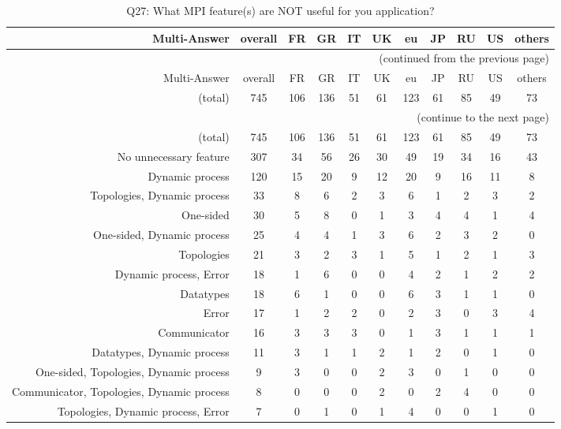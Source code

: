 \clearpage%
{\footnotesize\begin{landscape}%
\begin{longtable}[htb]{r|c|c|c|c|c|c|c|c|c|c}%
\caption{Q27: What MPI feature(s) are NOT useful for you application?}%
\label{tab:Q27-mans} \\%
\hline%
Multi-Answer & overall & FR & GR & IT & UK & eu & JP & RU & US & others \\
 \hline%
\endfirsthead%
\multicolumn{11}{r}{(continued from the previous page)}\\%
\hline%
Multi-Answer & overall & FR & GR & IT & UK & eu & JP & RU & US & others \\
 \hline%
\endhead%
\hline%
(total) & 745 & 106 & 136 & 51 & 61 & 123 & 61 & 85 & 49 & 73 \\%
\hline%
\multicolumn{11}{r}{(continue to the next page)}\\%
\endfoot%
\hline%
(total) & 745 & 106 & 136 & 51 & 61 & 123 & 61 & 85 & 49 & 73 \\%
\hline%
\endlastfoot%
\hline%
{No unnecessary feature} & 307 & 34 & 56 & 26 & 30 & 49 & 19 & 34 & 16 & 43 \\%
{Dynamic process} & 120 & 15 & 20 & 9 & 12 & 20 & 9 & 16 & 11 & 8 \\%
{Topologies, Dynamic process} & 33 & 8 & 6 & 2 & 3 & 6 & 1 & 2 & 3 & 2 \\%
{One-sided} & 30 & 5 & 8 & 0 & 1 & 3 & 4 & 4 & 1 & 4 \\%
{One-sided, Dynamic process} & 25 & 4 & 4 & 1 & 3 & 6 & 2 & 3 & 2 & 0 \\%
{Topologies} & 21 & 3 & 2 & 3 & 1 & 5 & 1 & 2 & 1 & 3 \\%
{Dynamic process, Error} & 18 & 1 & 6 & 0 & 0 & 4 & 2 & 1 & 2 & 2 \\%
{Datatypes} & 18 & 6 & 1 & 0 & 0 & 6 & 3 & 1 & 1 & 0 \\%
{Error} & 17 & 1 & 2 & 2 & 0 & 2 & 3 & 0 & 3 & 4 \\%
{Communicator} & 16 & 3 & 3 & 3 & 0 & 1 & 3 & 1 & 1 & 1 \\%
{Datatypes, Dynamic process} & 11 & 3 & 1 & 1 & 2 & 1 & 2 & 0 & 1 & 0 \\%
{One-sided, Topologies, Dynamic process} & 9 & 3 & 0 & 0 & 2 & 3 & 0 & 1 & 0 & 0 \\%
{Communicator, Topologies, Dynamic process} & 8 & 0 & 0 & 0 & 2 & 0 & 2 & 4 & 0 & 0 \\%
{Topologies, Dynamic process, Error} & 7 & 0 & 1 & 0 & 1 & 4 & 0 & 0 & 1 & 0 \\%

\end{longtable}
\end{landscape}}
